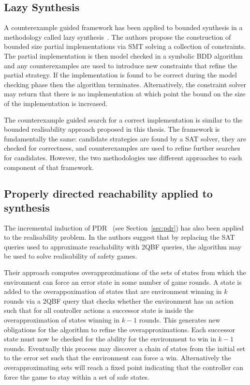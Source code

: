 \subsection{Lazy Synthesis}

A counterexample guided framework has been applied to bounded synthesis in a methodology called lazy synthesis~\cite{Finkbeiner12}. The authors propose the construction of bounded size partial implementations via SMT solving a collection of constraints. The partial implementation is then model checked in a symbolic BDD algorithm and any counterexamples are used to introduce new constraints that refine the partial strategy. If the implementation is found to be correct during the model checking phase then the algorithm terminates. Alternatively, the constraint solver may return that there is no implementation at which point the bound on the size of the implementation is increased. 

The counterexample guided search for a correct implementation is similar to the bounded realisability approach proposed in this thesis. The framework is fundamentally the same: candidate strategies are found by a SAT solver, they are checked for correctness, and counterexamples are used to refine further searches for candidates. However, the two methodologies use different approaches to each component of that framework.

\subsection{Properly directed reachability applied to synthesis}

The incremental induction of PDR~\cite{Bradley11} (see Section~\ref{sec:pdr}) has also been applied to the realisability problem. In \cite{Morgenstern13} the authors suggest that by replacing the SAT queries used to approximate reachability with 2QBF queries, the algorithm may be used to solve realisability of safety games. 

Their approach computes overapproximations of the sets of states from which the environment can force an error state in some number of game rounds. A state is added to the overappoximation of states that are environment winning in $k$ rounds via a 2QBF query that checks whether the environment has an action such that for all controller actions a successor state is inside the overapproximation of states winning in $k-1$ rounds. This generates new obligations for the algorithm to refine the overapproximations. Each successor state must now be checked for the ability for the environment to win in $k-1$ rounds. Eventually this process may discover a chain of states from the initial set to the error set such that the environment can force a win. Alternatively the overapproximating sets will reach a fixed point indicating that the controller can force the game to stay within a set of safe states.

